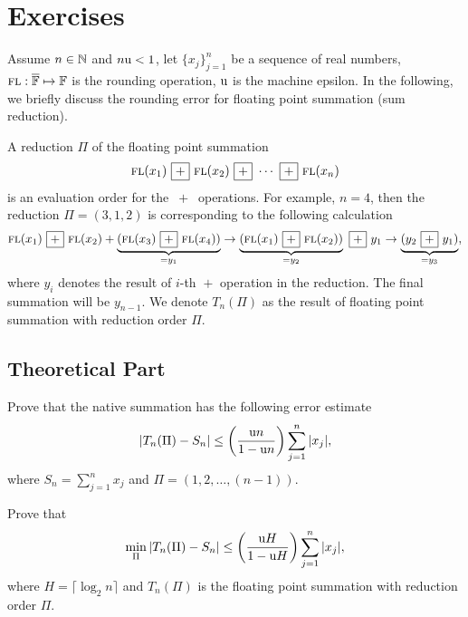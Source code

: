 \section{Exercises}
\label{Sec: Exe-1}
Assume $n\in \mathbb N$ and $n\textup{u} < 1$, let $\{x_j\}_{j=1}^n$ be a sequence of real numbers, $\textsc{fl}:\overline{\mathbb{F}}\mapsto \mathbb{F}$ is the rounding operation, $\textup{u}$ is the machine epsilon. In the following, we briefly discuss the rounding error for floating point summation (sum reduction). 

\begin{definition}
    A reduction $\Pi$ of the floating point summation 
    $${\textsc{fl}}(x_1) ~\boxed{+}~ {\textsc{fl}}(x_2) ~\boxed{+}~\cdots ~\boxed{+}~ {\textsc{fl}}(x_n)$$ is an evaluation order for the $~\boxed{+}~$ operations. For example, $n = 4$, then the reduction $\Pi = (3,1,2)$ is corresponding to the following calculation
$${\textsc{fl}}(x_1) ~\boxed{+}~ {\textsc{fl}}(x_2) + \underbrace{({\textsc{fl}}(x_3) ~\boxed{+}~ {\textsc{fl}}(x_4))}_{=y_1}\to \underbrace{({\textsc{fl}}(x_1) ~\boxed{+}~ {\textsc{fl}}(x_2))}_{=y_2} ~\boxed{+}~ y_1 \to \underbrace{(y_2 ~\boxed{+}~ y_1)}_{=y_3},$$
where $y_i$ denotes the result of $i$-th $\boxed{+}$ operation in the reduction. The final summation will be $y_{n-1}$. We denote $T_n(\Pi)$ as the result of floating point summation with reduction order $\Pi$.
\end{definition}


\subsection{Theoretical Part}
\begin{problem}
    Prove that the native summation has the following error estimate
    \begin{equation}
    |T_n(\Pi) - S_n|\le \left( \frac{\textup{u} n }{1 - \textup{u} n } \right)\sum_{j=1}^n |x_j|,
    \end{equation}
    where $S_n = \sum_{j=1}^n x_j$ and $\Pi = (1,2,\dots, (n-1))$.
\end{problem}

\begin{problem}
    Prove that
    \begin{equation}
    \min_{\Pi}|T_n(\Pi) - S_n| \le \left(\frac{ \textup{u} H }{1 - \textup{u} H  }\right)\sum_{j=1}^n |x_j|,
    \end{equation}
    where $H = \lceil\log_2 n \rceil$ and $T_n(\Pi)$ is the floating point summation with reduction order $\Pi$.
\end{problem}

